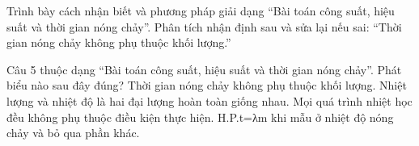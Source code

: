 \begin{bt}
Trình bày cách nhận biết và phương pháp giải dạng “Bài toán công suất, hiệu suất và thời gian nóng chảy”. Phân tích nhận định sau và sửa lại nếu sai: “Thời gian nóng chảy không phụ thuộc khối lượng.”
\end{bt}

\begin{ex}
Câu 5 thuộc dạng “Bài toán công suất, hiệu suất và thời gian nóng chảy”. Phát biểu nào sau đây đúng?
\choice
{Thời gian nóng chảy không phụ thuộc khối lượng.}
{Nhiệt lượng và nhiệt độ là hai đại lượng hoàn toàn giống nhau.}
{Mọi quá trình nhiệt học đều không phụ thuộc điều kiện thực hiện.}
{\True H.P.t=λm khi mẫu ở nhiệt độ nóng chảy và bỏ qua phần khác.}
\end{ex}

